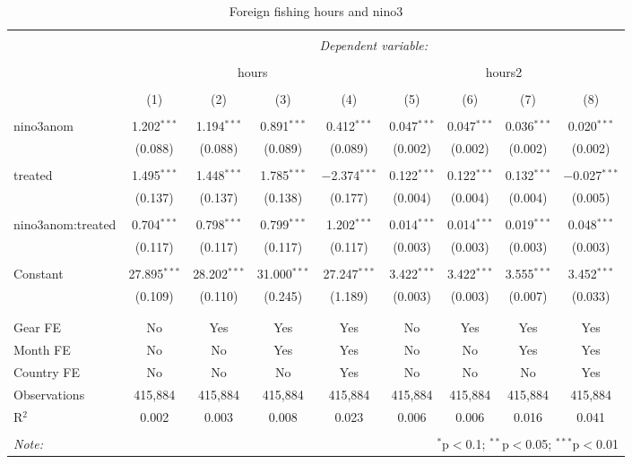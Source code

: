 \documentclass[]{article}
\begin{document}
\begin{table}[!htbp] \centering 
  \caption{\label{tab:ff_reg}Foreign fishing hours and nino3} 
  \label{} 
\small 
\begin{tabular}{@{\extracolsep{5pt}}lcccccccc} 
\\[-1.8ex]\hline 
\hline \\[-1.8ex] 
 & \multicolumn{8}{c}{\textit{Dependent variable:}} \\ 
\cline{2-9} 
\\[-1.8ex] & \multicolumn{4}{c}{hours} & \multicolumn{4}{c}{hours2} \\ 
\\[-1.8ex] & (1) & (2) & (3) & (4) & (5) & (6) & (7) & (8)\\ 
\hline \\[-1.8ex] 
 nino3anom & 1.202$^{***}$ & 1.194$^{***}$ & 0.891$^{***}$ & 0.412$^{***}$ & 0.047$^{***}$ & 0.047$^{***}$ & 0.036$^{***}$ & 0.020$^{***}$ \\ 
  & (0.088) & (0.088) & (0.089) & (0.089) & (0.002) & (0.002) & (0.002) & (0.002) \\ 
  & & & & & & & & \\ 
 treated & 1.495$^{***}$ & 1.448$^{***}$ & 1.785$^{***}$ & $-$2.374$^{***}$ & 0.122$^{***}$ & 0.122$^{***}$ & 0.132$^{***}$ & $-$0.027$^{***}$ \\ 
  & (0.137) & (0.137) & (0.138) & (0.177) & (0.004) & (0.004) & (0.004) & (0.005) \\ 
  & & & & & & & & \\ 
 nino3anom:treated & 0.704$^{***}$ & 0.798$^{***}$ & 0.799$^{***}$ & 1.202$^{***}$ & 0.014$^{***}$ & 0.014$^{***}$ & 0.019$^{***}$ & 0.048$^{***}$ \\ 
  & (0.117) & (0.117) & (0.117) & (0.117) & (0.003) & (0.003) & (0.003) & (0.003) \\ 
  & & & & & & & & \\ 
 Constant & 27.895$^{***}$ & 28.202$^{***}$ & 31.000$^{***}$ & 27.247$^{***}$ & 3.422$^{***}$ & 3.422$^{***}$ & 3.555$^{***}$ & 3.452$^{***}$ \\ 
  & (0.109) & (0.110) & (0.245) & (1.189) & (0.003) & (0.003) & (0.007) & (0.033) \\ 
  & & & & & & & & \\ 
\hline \\[-1.8ex] 
Gear FE & No & Yes & Yes & Yes & No & Yes & Yes & Yes \\ 
Month FE & No & No & Yes & Yes & No & No & Yes & Yes \\ 
Country FE & No & No & No & Yes & No & No & No & Yes \\ 
Observations & 415,884 & 415,884 & 415,884 & 415,884 & 415,884 & 415,884 & 415,884 & 415,884 \\ 
R$^{2}$ & 0.002 & 0.003 & 0.008 & 0.023 & 0.006 & 0.006 & 0.016 & 0.041 \\ 
\hline 
\hline \\[-1.8ex] 
\textit{Note:}  & \multicolumn{8}{r}{$^{*}$p$<$0.1; $^{**}$p$<$0.05; $^{***}$p$<$0.01} \\ 
\end{tabular} 
\end{table}
\end{document}
